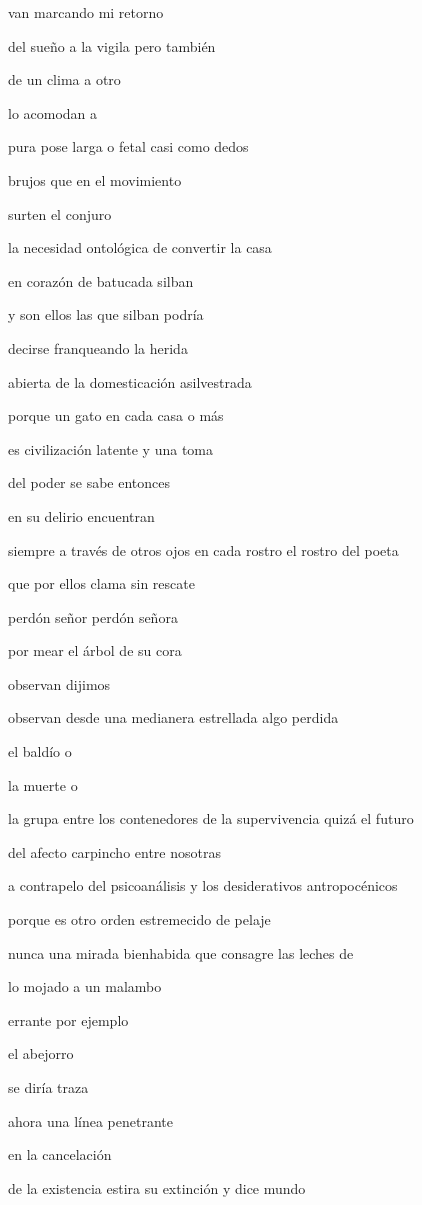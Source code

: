 \documentclass[
]{book}
\begin{document}
van marcando mi retorno

del sueño a la vigila pero también

de un clima a otro

lo acomodan a

pura pose larga o fetal casi como dedos

brujos que en el movimiento

surten el conjuro

la necesidad ontológica de convertir la casa

en corazón de batucada silban

y son ellos las que silban podría

decirse franqueando la herida

abierta de la domesticación asilvestrada

porque un gato en cada casa o más

es civilización latente y una toma

del poder se sabe entonces

en su delirio encuentran

siempre a través de otros ojos en cada rostro el rostro del poeta

que por ellos clama sin rescate

perdón señor perdón señora

por mear el árbol de su cora

observan dijimos

observan desde una medianera estrellada algo perdida

el baldío o

la muerte o

la grupa entre los contenedores de la supervivencia quizá el futuro

del afecto carpincho entre nosotras

a contrapelo del psicoanálisis y los desiderativos antropocénicos

porque es otro orden estremecido de pelaje

nunca una mirada bienhabida que consagre las leches de

lo mojado a un malambo

errante por ejemplo

el abejorro

se diría traza

ahora una línea penetrante

en la cancelación

de la existencia estira su extinción y dice mundo
\end{document}

